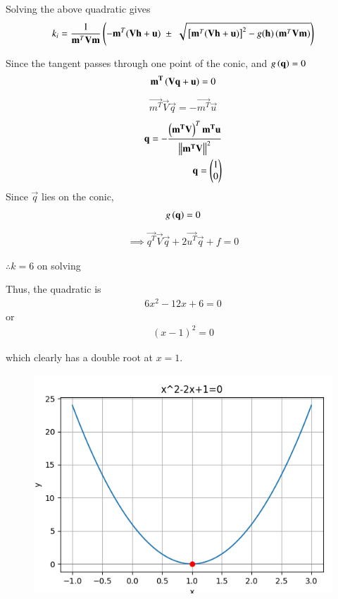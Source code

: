 \documentclass[journal]{IEEEtran}
\begin{document}
Solving the above quadratic gives 
\begin{align}
k_i = \frac{1}{\mathbf{m}^{T}\mathbf{V}\mathbf{m}}
\left(
    -\mathbf{m}^{T} (\mathbf{V}\mathbf{h} + \mathbf{u})
    \;\pm\;
    \sqrt{ {}\left[\mathbf{m}^{T}(\mathbf{V}\mathbf{h} + \mathbf{u})\right]^2
    - g(\mathbf{h}) \, (\mathbf{m}^{T}\mathbf{V}\mathbf{m}) }
    \right)
\end{align}

Since the tangent passes through one point of the conic, and $g\left(\mathbf{q}\right)=0$
\begin{align}
\mathbf{m^T}\left(\mathbf{\mathbf{V}\mathbf{q} + \mathbf{u}}\right) = 0
\end{align}
\begin{align}
\vec{m^T}\vec{V}\vec{q} = -\vec{m^T}\vec{u}
\end{align}
\begin{align}
\mathbf{q} = -\frac{\left(\mathbf{m^T}\mathbf{V}\right)^T\mathbf{m^T}\mathbf{u}}{\left\lVert\mathbf{m^T}\mathbf{V}\right\rVert^2} \\
\mathbf{q}=\begin{pmatrix}1 \\ 0\end{pmatrix}
\end{align}
Since $\vec{q}$ lies on the conic, 
\begin{align}
g\left(\mathbf{\mathbf{q}}\right) = 0
\end{align}
\begin{align}
\implies \vec{q^T}\vec{V}\vec{q} + 2\vec{u^T}\vec{q} + f = 0
\end{align}

$\therefore k=6$ on solving

Thus, the quadratic is
\begin{align}
6x^2 - 12x + 6 = 0
\end{align}
or
\begin{align}
(x - 1)^2 = 0
\end{align}

which clearly has a double root at $x=1$.
\begin{figure}[ht!]
\centering
\includegraphics[height=0.4\textheight, keepaspectratio]{figs/parabola.png}
\end{figure}
\end{document}
